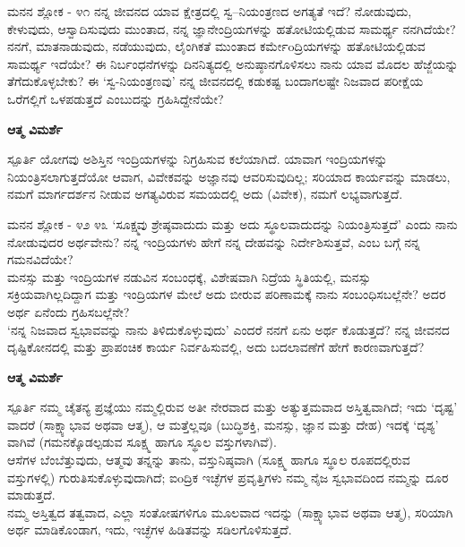 \newpage
\begin{mananam}{\mananamfont ಮನನ ಶ್ಲೋಕ - ೪೧}
\mananamtext ನನ್ನ ಜೀವನದ ಯಾವ ಕ್ಷೇತ್ರದಲ್ಲಿ ಸ್ವ–ನಿಯಂತ್ರಣದ ಅಗತ್ಯತೆ ಇದೆ? ನೋಡುವುದು, ಕೇಳುವುದು, ಆಸ್ವಾದಿಸುವುದು ಮುಂತಾದ, ನನ್ನ ಜ್ಞಾನೇಂದ್ರಿಯಗಳನ್ನು ಹತೋಟಿಯಲ್ಲಿಡುವ ಸಾಮರ್ಥ್ಯ ನನಗಿದೆಯೇ? ನನಗೆ,  ಮಾತನಾಡುವುದು, ನಡೆಯುವುದು, ಲೈಂಗಿಕತೆ ಮುಂತಾದ ಕರ್ಮೇoದ್ರಿಯಗಳನ್ನು  ಹತೋಟಿಯಲ್ಲಿಡುವ ಸಾಮರ್ಥ್ಯ ಇದೆಯೇ? ಈ ನಿರ್ಬಂಧನೆಗಳನ್ನು ದಿನನಿತ್ಯದಲ್ಲಿ ಅನುಷ್ಠಾನಗೊಳಿಸಲು ನಾನು ಯಾವ ಮೊದಲ ಹೆಜ್ಜೆಯನ್ನು ತೆಗೆದುಕೊಳ್ಳಬೇಕು? ಈ ‘ಸ್ವ-ನಿಯಂತ್ರಣವು’ ನನ್ನ ಜೀವನದಲ್ಲಿ ಕಡುಕಷ್ಟ ಬಂದಾಗಲಷ್ಟೇ ನಿಜವಾದ ಪರೀಕ್ಷೆಯ ಒರೆಗಲ್ಲಿಗೆ ಒಳಪಡುತ್ತದೆ ಎಂಬುದನ್ನು ಗ್ರಹಿಸಿದ್ದೇನೆಯೇ? 
\end{mananam}
\WritingHand\enspace\textbf{ಆತ್ಮ ವಿಮರ್ಶೆ}\\
\begin{inspiration}{\mananamfont ಸ್ಪೂರ್ತಿ}
\mananamtext ಯೋಗವು ಅಶಿಸ್ತಿನ ಇಂದ್ರಿಯಗಳನ್ನು ನಿಗ್ರಹಿಸುವ ಕಲೆಯಾಗಿದೆ. ಯಾವಾಗ ಇಂದ್ರಿಯಗಳನ್ನು ನಿಯಂತ್ರಿಸಲಾಗುತ್ತದೆಯೋ ಆವಾಗ, ವಿವೇಕವನ್ನು ಅಜ್ಞಾನವು ಆವರಿಸುವುದಿಲ್ಲ; ಸರಿಯಾದ ಕಾರ್ಯವನ್ನು ಮಾಡಲು, ನಮಗೆ ಮಾರ್ಗದರ್ಶನ ನೀಡುವ ಅಗತ್ಯವಿರುವ ಸಮಯದಲ್ಲಿ ಅದು (ವಿವೇಕ), ನಮಗೆ ಲಭ್ಯವಾಗುತ್ತದೆ.
\end{inspiration}

\newpage
\begin{mananam}{\mananamfont ಮನನ ಶ್ಲೋಕ - ೪೨ ೪೩}
\mananamtext ‘ಸೂಕ್ಷ್ಮವು ಶ್ರೇಷ್ಠವಾದುದು ಮತ್ತು ಅದು ಸ್ಥೂಲವಾದುದನ್ನು ನಿಯಂತ್ರಿಸುತ್ತದೆ’ ಎಂದು ನಾನು ನೋಡುವುದರ  ಅರ್ಥವೇನು?
ನನ್ನ ಇಂದ್ರಿಯಗಳು ಹೇಗೆ ನನ್ನ ದೇಹವನ್ನು ನಿರ್ದೇಶಿಸುತ್ತವೆ, ಎಂಬ ಬಗ್ಗೆ ನನ್ನ ಗಮನವಿದೆಯೇ?\\
ಮನಸ್ಸು ಮತ್ತು ಇಂದ್ರಿಯಗಳ ನಡುವಿನ ಸಂಬಂಧಕ್ಕೆ, ವಿಶೇಷವಾಗಿ ನಿದ್ರೆಯ ಸ್ಥಿತಿಯಲ್ಲಿ, ಮನಸ್ಸು ಸಕ್ರಿಯವಾಗಿಲ್ಲದಿದ್ದಾಗ ಮತ್ತು ಇಂದ್ರಿಯಗಳ ಮೇಲೆ ಅದು ಬೀರುವ ಪರಿಣಾಮಕ್ಕೆ  ನಾನು ಸಂಬಂಧಿಸಬಲ್ಲೆನೇ? ಅದರ ಅರ್ಥ ಏನೆಂದು ಗ್ರಹಿಸಬಲ್ಲೆನೇ?\\
‘ನನ್ನ ನಿಜವಾದ ಸ್ವಭಾವವನ್ನು ನಾನು ತಿಳಿದುಕೊಳ್ಳುವುದು’ ಎಂದರೆ ನನಗೆ ಏನು ಅರ್ಥ ಕೊಡುತ್ತದೆ? ನನ್ನ ಜೀವನದ ದೃಷ್ಟಿಕೋನದಲ್ಲಿ ಮತ್ತು ಪ್ರಾಪಂಚಿಕ ಕಾರ್ಯ ನಿರ್ವಹಿಸುವಲ್ಲಿ, ಅದು ಬದಲಾವಣೆಗೆ ಹೇಗೆ ಕಾರಣವಾಗುತ್ತದೆ?
\end{mananam}
\WritingHand\enspace\textbf{ಆತ್ಮ ವಿಮರ್ಶೆ}\\
\begin{inspiration}{\mananamfont ಸ್ಪೂರ್ತಿ}
\tiny \mananamtext ನಮ್ಮ ಚೈತನ್ಯ ಪ್ರಜ್ಞೆಯು ನಮ್ಮಲ್ಲಿರುವ ಅತೀ ನೇರವಾದ ಮತ್ತು ಅತ್ಯುತ್ತಮವಾದ ಅಸ್ತಿತ್ವವಾಗಿದೆ; ಇದು ‘ದೃಷ್ಟ’ ವಾದರೆ (ಸಾಕ್ಷ್ಯಾಭಾವ ಅಥವಾ ಆತ್ಮ), ಆ ಮತ್ತೆಲ್ಲವೂ (ಬುದ್ಧಿಶಕ್ತಿ, ಮನಸ್ಸು, ಜ್ಞಾನ ಮತ್ತು ದೇಹ) ಇದಕ್ಕೆ ‘ದೃಶ್ಯ’ ವಾಗಿವೆ (ಗಮನಕ್ಕೊಡಲ್ಪಡುವ ಸೂಕ್ಷ್ಮ ಹಾಗೂ ಸ್ಥೂಲ  ವಸ್ತುಗಳಾಗಿವೆ).\\
ಆಸೆಗಳ ಬೆಂಬೆತ್ತುವುದು, ಆತ್ಮವು ತನ್ನನ್ನು ತಾನು, ವಸ್ತುನಿಷ್ಠವಾಗಿ (ಸೂಕ್ಷ್ಮ ಹಾಗೂ ಸ್ಥೂಲ ರೂಪದಲ್ಲಿರುವ  ವಸ್ತುಗಳಲ್ಲಿ) ಗುರುತಿಸುಕೊಳ್ಳುವುದಾಗಿದೆ; ಐoದ್ರಿಕ ಇಚ್ಛೆಗಳ ಪ್ರವೃತ್ತಿಗಳು ನಮ್ಮ ನೈಜ ಸ್ವಭಾವದಿಂದ ನಮ್ಮನ್ನು ದೂರ ಮಾಡುತ್ತದೆ.\\
ನಮ್ಮ ಅಸ್ತಿತ್ವದ ತತ್ವವಾದ, ಎಲ್ಲಾ ಸಂತೋಷಗಳಿಗೂ ಮೂಲವಾದ ಇದನ್ನು (ಸಾಕ್ಷ್ಯಾಭಾವ ಅಥವಾ ಆತ್ಮ), ಸರಿಯಾಗಿ ಅರ್ಥ ಮಾಡಿಕೊಂಡಾಗ, ಇದು, ಇಚ್ಛೆಗಳ ಹಿಡಿತವನ್ನು ಸಡಿಲಗೊಳಿಸುತ್ತದೆ.
\end{inspiration}
\newpage


